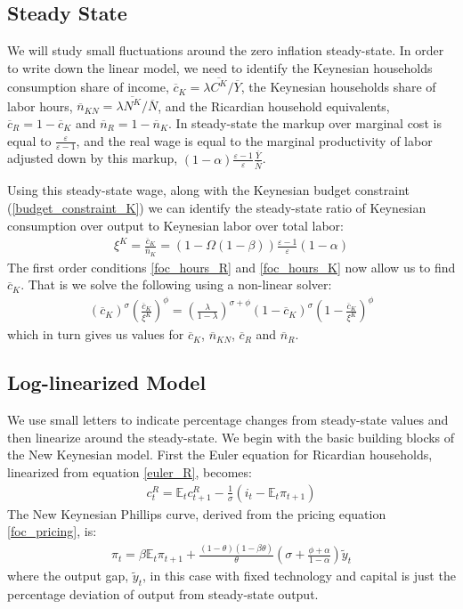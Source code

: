 \documentclass[titlepage]{\econtex}\newcommand{\texname}{ConsumptionHeterogeneity}
\begin{document}
\subsection{Steady State}
We will study small fluctuations around the zero inflation steady-state. In order to write down the linear model, we need to identify the Keynesian households consumption share of income, $\overline{c}_{K} = \lambda\overline{C^K}/\overline{Y}$, the Keynesian households share of labor hours, $\overline{n}_{KN} = \lambda\overline{N^K}/\overline{N}$, and the Ricardian household equivalents, $\overline{c}_{R} = 1- \overline{c}_{K}$ and  $\overline{n}_{R} = 1- \overline{n}_{K}$. In steady-state the markup over marginal cost is equal to $\frac{\varepsilon}{\varepsilon-1}$, and the real wage is equal to the marginal productivity of labor adjusted down by this markup, $(1-\alpha) \frac{\varepsilon-1}{\varepsilon}\frac{\overline{Y}}{\overline{N}}$. 


Using this steady-state wage, along with the Keynesian budget constraint (\ref{budget_constraint_K}) we can identify the steady-state ratio of Keynesian consumption over output to Keynesian labor over total labor:
\begin{align}
\xi^K=\frac{\overline{c}_{K}}{\overline{n}_{K}} = \left(1-\Omega(1-\beta)\right)\frac{\varepsilon-1}{\varepsilon}(1-\alpha) \label{c_K_n_K}
\end{align}
The first order conditions \ref{foc_hours_R} and \ref{foc_hours_K} now allow us to find $\overline{c}_{K}$. That is we solve the following using a non-linear solver:
\begin{align}
(\overline{c}_{K})^\sigma  \left(\frac{\overline{c}_{K}}{\xi^K}\right)^\phi = \left(\frac{\lambda}{1-\lambda}\right)^{\sigma+\phi}(1-\overline{c}_{K})^\sigma  (1-\frac{\overline{c}_{K}}{\xi^K})^\phi	\label{c_K_ss}
\end{align}
which in turn gives us values for $\overline{c}_{K}$, $\overline{n}_{KN}$, $\overline{c}_{R}$ and  $\overline{n}_{R}$.


\subsection{Log-linearized Model}
We use small letters to indicate percentage changes from steady-state values and then linearize around the steady-state. We begin with the basic building blocks of the New Keynesian model. First the Euler equation for Ricardian households, linearized from equation \ref{euler_R}, becomes:
\begin{align}
c^R_t = \mathbb{E}_t c^R_{t+1} - \frac{1}{\sigma}(i_t - \mathbb{E}_t\pi_{t+1}) \label{euler_R_linear}
\end{align}
The New Keynesian Phillips curve, derived from the pricing equation \ref{foc_pricing}, is:
\begin{align}
\pi_t=\beta \mathbb{E}_t\pi_{t+1}+\frac{(1-\theta)(1-\beta\theta)}{\theta}\left(\sigma +  \frac{\phi + \alpha}{1-\alpha} \right)\tilde{y}_t \label{NKphillips_linear}
\end{align}
where the output gap, $\tilde{y}_t$, in this case with fixed technology and capital is just the percentage deviation of output from steady-state output.
\end{document}
